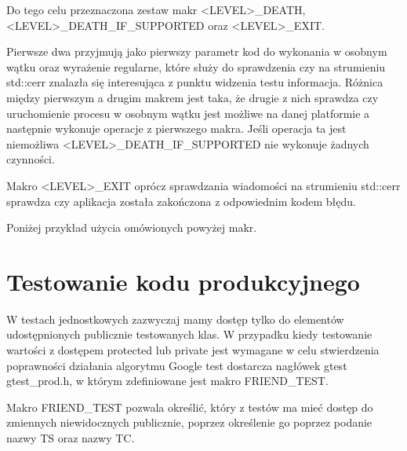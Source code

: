\documentclass[12pt,a4paper,notitlepage]{report}
\begin{document}
Do tego celu przeznaczona zestaw makr <LEVEL>{\_}DEATH, <LEVEL>{\_}DEATH{\_}IF{\_}SUPPORTED oraz <LEVEL>{\_}EXIT. 

Pierwsze dwa przyjmują jako pierwszy parametr kod do wykonania w osobnym wątku oraz wyrażenie regularne, które służy do sprawdzenia czy na strumieniu std::cerr znalazła się interesująca z punktu widzenia testu informacja. Różnica między pierwszym a drugim makrem jest taka, że drugie z nich sprawdza czy uruchomienie procesu w osobnym wątku jest możliwe na danej platformie a następnie wykonuje operacje z pierwszego makra. Jeśli operacja ta jest niemożliwa <LEVEL>{\_}DEATH{\_}IF{\_}SUPPORTED nie wykonuje żadnych czynności.

Makro <LEVEL>{\_}EXIT oprócz sprawdzania wiadomości na strumieniu std::cerr sprawdza czy aplikacja została zakończona z odpowiednim kodem błędu.

Poniżej przykład użycia omówionych powyżej makr.

			

\section{Testowanie kodu produkcyjnego}

W testach jednostkowych zazwyczaj mamy dostęp tylko do elementów udostępnionych publicznie testowanych klas. W przypadku kiedy testowanie wartości z dostępem protected lub private jest wymagane w celu stwierdzenia poprawności działania algorytmu Google test dostarcza nagłówek gtest\\gtest{\_}prod.h, w którym zdefiniowane jest makro FRIEND{\_}TEST.

Makro FRIEND{\_}TEST pozwala określić, który z testów ma mieć dostęp do zmiennych niewidocznych publicznie, poprzez określenie go poprzez podanie nazwy TS oraz nazwy TC.

			
\end{document}

